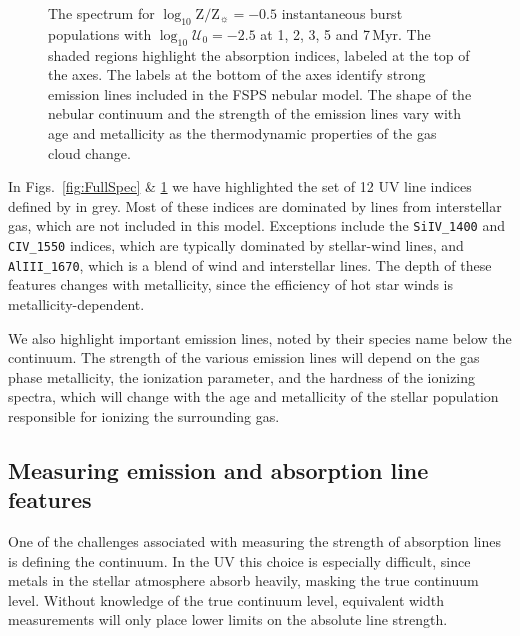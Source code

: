 \documentclass[preprint2]{aastex61}
\newcommand{\FSPS}{{\sc FSPS}\xspace}
\newcommand{\Myr}{$\,$Myr\xspace}
\newcommand{\logten}{\ensuremath{\log_{10}}}
\newcommand{\logZeq}[1]{\ensuremath{\logten \mathrm{Z}/\mathrm{Z}_{\sun} = #1}}
\newcommand{\logUeq}[1]{\ensuremath{\logten \mathcal{U}_0 = #1}}
\begin{document}
\begin{figure}
  \begin{center}
    \caption{The spectrum for \logZeq{-0.5} instantaneous burst populations with \logUeq{-2.5} at 1, 2, 3, 5 and 7\Myr. The shaded regions highlight the \citet{Leitherer+2011} absorption indices, labeled at the top of the axes. The labels at the bottom of the axes identify strong emission lines included in the \FSPS nebular model. The shape of the nebular continuum and the strength of the emission lines vary with age and metallicity as the thermodynamic properties of the gas cloud change.}
    \label{fig:FullSpecAge}
  \end{center}
\end{figure}


In Figs.~\ref{fig:FullSpec} \& \ref{fig:FullSpecAge} we have highlighted the set of 12 UV line indices defined by \citet{Leitherer+2011} in grey. Most of these indices are dominated by lines from interstellar gas, which are not included in this model. Exceptions include the {\tt SiIV\_1400} and {\tt CIV\_1550} indices, which are typically dominated by stellar-wind lines, and {\tt AlIII\_1670}, which is a blend of wind and interstellar lines. The depth of these features changes with metallicity, since the efficiency of hot star winds is metallicity-dependent.

We also highlight important emission lines, noted by their species name below the continuum. The strength of the various emission lines will depend on the gas phase metallicity, the ionization parameter, and the hardness of the ionizing spectra, which will change with the age and metallicity of the stellar population responsible for ionizing the surrounding gas.

\subsection{Measuring emission and absorption line features}\label{sec:mod:meas}

One of the challenges associated with measuring the strength of absorption lines is defining the continuum. In the UV this choice is especially difficult, since metals in the stellar atmosphere absorb heavily, masking the true continuum level. Without knowledge of the true continuum level, equivalent width measurements will only place lower limits on the absolute line strength. 
\end{document}
